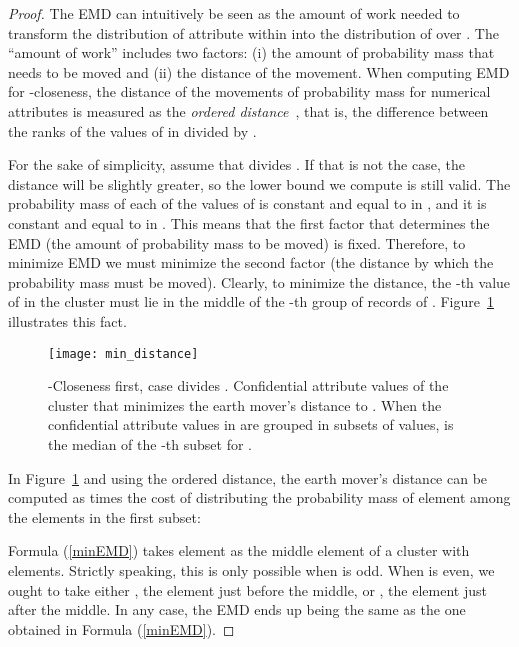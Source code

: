 \documentclass[10pt,journal,compsoc]{IEEEtran}
\theoremstyle{definition}
\theoremstyle{plain}
\begin{document}
\begin{proof}
	The EMD can intuitively be seen as the amount of work needed to transform
	the distribution of attribute  within  into 
the distribution of  over . The ``amount
	of work'' includes two factors: (i) the amount of probability mass
	that needs to be moved and (ii) the distance of the movement. When
	computing EMD for -closeness, the distance of the movements
	of probability mass for numerical attributes is measured as the 
{\em ordered distance}~\cite{Li2007t-Closeness},
	that is, the difference between the ranks of the values of  in 
	divided by .
	
	For the sake of simplicity, assume that  divides . If that
	is not the case, the distance will be slightly greater, so the lower
	bound we compute is still valid. The probability mass of each of the
	values of  is constant and equal to  in , and it 
is  constant and equal to  in . This means that the first
	factor that determines the EMD (the amount of probability mass
to be moved) is fixed. Therefore, to minimize 
	EMD we must minimize the second factor (the distance by which the
	probability mass must be moved). Clearly, 
to minimize the distance, the -th value of  in the cluster
	must lie in the middle of the -th group of  records of .
	Figure~\ref{fig:min_distance} illustrates this fact.

	\begin{figure}[!t]
		\centering
		\texttt{[image: min\_distance]}
\protect\caption{-Closeness first, case  divides . Confidential attribute values  of the cluster 
			that minimizes the earth mover's distance to . When 
the confidential
			attribute values in  are grouped in  subsets 
of  values,  is the median of the -th subset for . \label{fig:min_distance}}
	\end{figure}
	
	
	In Figure~\ref{fig:min_distance} and using the 
ordered distance, the earth mover's
	distance can be computed as  times the cost of distributing the
	probability mass of element  among the  elements in
	the first subset:

	Formula (\ref{minEMD}) takes element  as the middle element of a
	cluster with  elements. Strictly speaking, this is only possible
when  is odd.
When  is even, we
ought to take 
either , the element just before
	the middle, or , the element just after
	the middle. In any case, the EMD ends up being the same as the 
one obtained in Formula (\ref{minEMD}). 
\end{proof}
\end{document}
